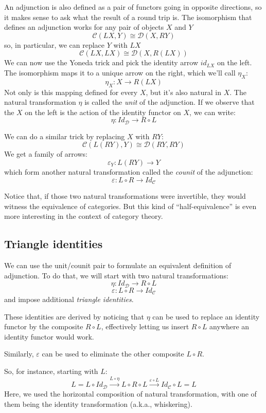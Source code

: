 \documentclass[DaoFP]{subfiles}
\begin{document}
An adjunction is also defined as a pair of functors going in opposite directions, so it makes sense to ask what the result of a round trip is. The isomorphism that defines an adjunction works for any pair of objects $X$ and $Y$
\[  \mathcal{C} (L X, Y) \cong \mathcal{D}( X , R Y)\]
so, in particular, we can replace $Y$ with $L X$
\[  \mathcal{C} (L X, L X) \cong \mathcal{D}( X , R (L X))\]
We can now use the Yoneda trick and pick the identity arrow $id_{L X}$ on the left. The isomorphism maps it to a unique arrow on the right, which we'll call $\eta_X$:
\[ \eta_X \colon X \to R ( L X) \]
Not only is this mapping defined for every $X$, but it's also natural in $X$. The natural transformation $\eta$ is called the \emph{unit} of the adjunction. If we observe that the $X$ on the left is the action of the identity functor on $X$, we can write:
\[ \eta \colon Id_{\mathcal{D}} \to R \circ L \]

We can do a similar trick by replacing $X$ with $R Y$:
\[  \mathcal{C} (L (R Y), Y) \cong \mathcal{D}( R Y , R Y)\]
We get a family of arrows:
\[ \varepsilon_Y \colon L (R Y) \to Y \]
which form another natural transformation called the \emph{counit} of the adjunction:
\[ \varepsilon \colon L \circ R \to Id_{\mathcal{C}}  \]

Notice that, if those two natural transformations were invertible, they would witness the equivalence of categories. But this kind of ``half-equivalence'' is even more interesting in the context of category theory. 

\subsection{Triangle identities}

We can use the unit/counit pair to formulate an equivalent  definition of adjunction. To do that, we will start with two natural transformations:
\[ \eta \colon Id_{\mathcal{D}} \to R \circ L \]
\[ \varepsilon \colon L \circ R \to Id_{\mathcal{C}}  \]
and impose additional \emph{triangle identities}. 

These identities are derived by noticing that $\eta$ can be used to replace an identity functor by the composite $R \circ L$, effectively letting us insert $R \circ L$ anywhere an identity functor would work.

Similarly, $\varepsilon$ can be used to eliminate the other composite $L \circ R$. 

So, for instance, starting with $L$:
\[ L = L \circ Id_{\mathcal{D}} \xrightarrow{L \circ \eta} L \circ R \circ L \xrightarrow{\varepsilon \circ L} Id_{\mathcal{C}} \circ L = L \]
Here, we used the horizontal composition of natural transformation, with one of them being the identity transformation (a.k.a., whiskering).
\end{document}

